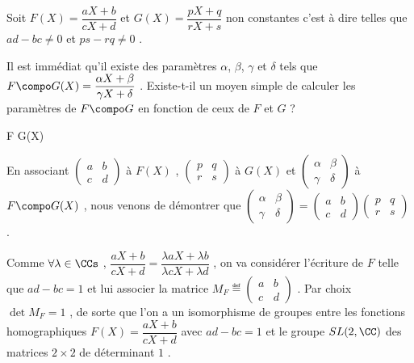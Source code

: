 Soit
$F(X) = \dfrac{a X + b}{c X + d}$
et
$G(X) = \dfrac{p X + q}{r X + s}$
non constantes c'est à dire telles que
$ad - bc \neq 0$
et
$ps - rq \neq 0$ .


Il est immédiat qu'il existe des paramètres $\alpha$, $\beta$, $\gamma$ et $\delta$ tels que
$F \compo G(X) = \dfrac{\alpha X + \beta}{\gamma X + \delta}$ .
Existe-t-il un moyen simple de calculer les paramètres de $F \compo G$ en fonction de ceux de $F$ et $G$ ?


\bigskip


\begin{explain}[style = sar]
	F \compo G(X) \,
		\explnext{}
		\explnext{}
\end{explain}


\medskip


En associant
$\begin{pmatrix}
    a & b \\
    c & d
\end{pmatrix}$ à $F(X)$ ,
$\begin{pmatrix}
    p & q \\
    r & s
\end{pmatrix}$ à $G(X)$
et
$\begin{pmatrix}
    \alpha & \beta  \\
    \gamma & \delta
\end{pmatrix}$ à $F \compo G(X)$ ,
nous venons de démontrer que
$\begin{pmatrix}
    \alpha & \beta  \\
    \gamma & \delta
\end{pmatrix}
=
\begin{pmatrix}
    a & b \\
    c & d
\end{pmatrix}
\begin{pmatrix}
    p & q \\
    r & s
\end{pmatrix}$ .


\medskip


Comme $\forall \lambda \in \CCs$ ,
$\dfrac{a X + b}{c X + d} = \dfrac{\lambda a X + \lambda b}{\lambda c X + \lambda d}$ , on va considérer l'écriture de $F$ telle que $ad- bc = 1$ et lui associer la matrice
$M_F \eqdef \begin{pmatrix}
    a & b \\
    c & d
\end{pmatrix}$ .
Par choix $\det M_F = 1$ , de sorte que l'on a un isomor\-phisme de groupes entre les fonctions homographiques
$F(X) = \dfrac{a X + b}{c X + d}$ avec $ad- bc = 1$
et le groupe $SL(2 , \CC)$ des matrices $2 \times 2$ de déterminant $1$ .


